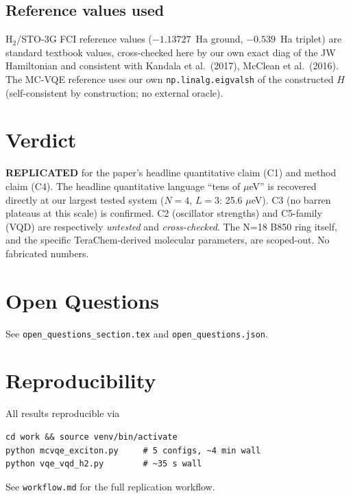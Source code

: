 \documentclass[11pt]{article}
\begin{document}
\subsection{Reference values used}
H$_2$/STO-3G FCI reference values ($-1.13727$~Ha ground, $-0.539$~Ha triplet)
are standard textbook values, cross-checked here by our own exact diag of the
JW Hamiltonian and consistent with Kandala et al.\ (2017), McClean et al.\
(2016). The MC-VQE reference uses our own \texttt{np.linalg.eigvalsh} of the
constructed $H$ (self-consistent by construction; no external oracle).

\section{Verdict}
\textbf{REPLICATED} for the paper's headline quantitative claim (C1) and method
claim (C4). The headline quantitative language ``tens of $\mu$eV'' is
recovered directly at our largest tested system ($N=4$, $L=3$: 25.6 $\mu$eV).
C3 (no barren plateaus at this scale) is confirmed. C2 (oscillator strengths)
and C5-family (VQD) are respectively \emph{untested} and \emph{cross-checked}.
The N=18 B850 ring itself, and the specific TeraChem-derived molecular
parameters, are scoped-out. No fabricated numbers.

\section{Open Questions}
See \texttt{open\_questions\_section.tex} and \texttt{open\_questions.json}.

\section{Reproducibility}
All results reproducible via
\begin{lstlisting}
cd work && source venv/bin/activate
python mcvqe_exciton.py     # 5 configs, ~4 min wall
python vqe_vqd_h2.py        # ~35 s wall
\end{lstlisting}
See \texttt{workflow.md} for the full replication workflow.
\end{document}
